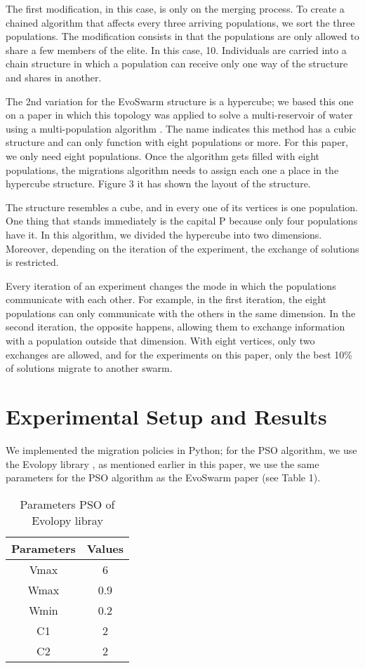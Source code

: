 \documentclass[runningheads]{llncs}
\begin{document}
The first modification, in this case, is only on the merging process. To create
a chained algorithm that affects every three arriving populations, we sort the
three populations. The modification consists in that the populations are only
allowed to share a few members of the elite. In this case, 10. Individuals are
carried into a chain structure in which a population can receive only one way of
the structure and shares in another.

The 2nd variation for the EvoSwarm structure is a hypercube; we based this one
on a paper in which this topology was applied to solve a multi-reservoir of
water using a multi-population algorithm \cite{b20}. The name indicates this
method has a cubic structure and can only function with eight populations or
more. For this paper, we only need eight populations. Once the algorithm gets
filled with eight populations, the migrations algorithm needs to assign each one
a place in the hypercube structure. Figure 3 it has shown the layout of the
structure.

The structure resembles a cube, and in every one of its vertices is one
population. One thing that stands immediately is the capital P because only four
populations have it. In this algorithm, we divided the hypercube into two
dimensions. Moreover, depending on the iteration of the experiment, the exchange
of solutions is restricted.

Every iteration of an experiment changes the mode in which the populations
communicate with each other. For example, in the first iteration, the eight
populations can only communicate with the others in the same dimension. In the
second iteration, the opposite happens, allowing them to exchange information
with a population outside that dimension. With eight vertices, only two
exchanges are allowed, and for the experiments on this paper, only the best 10\%
of solutions migrate to another swarm.


\section{Experimental Setup and Results}

We implemented the migration policies in Python; for the PSO algorithm, we use
the Evolopy library \cite{b19}, as mentioned earlier in this paper, we use the
same parameters for the PSO algorithm as the EvoSwarm paper (see Table 1).



\begin{table}[h!]
\centering
\caption{Parameters PSO of Evolopy libray}
\begin{tabular}{|c c|} 
 \hline
 Parameters & Values  \\ [0.5ex] 
 \hline\hline
 Vmax & 6 \\ 
 Wmax & 0.9 \\
 Wmin & 0.2 \\
C1 & 2 \\
C2 & 2 \\[0.5ex]
 \hline
\end{tabular}
\label{table:1}
\end{table}
\end{document}
